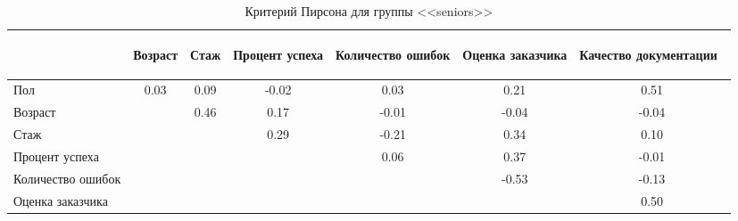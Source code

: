 \begin{table}[H]
	\centering
	\caption{Критерий Пирсона для группы <<seniors>>}
	\begin{tabular}{|l|c|c|c|c|c|c|}
		\hline
		& 
		\begin{sideways}
			Возраст
		\end{sideways}  & 
		\begin{sideways}
			Стаж
		\end{sideways} & 
		\begin{sideways}
			Процент успеха
		\end{sideways} & 
		\begin{sideways}
			Количество ошибок
		\end{sideways} &
		\begin{sideways}
			Оценка заказчика
		\end{sideways} & 
		\begin{sideways}
			Качество документации~
		\end{sideways} \\ \hline
		Пол                   & 0.03 & 0.09 & -0.02 & 0.03 & 0.21 & 0.51 \\ \hline
		Возраст               && 0.46 & 0.17 & -0.01 & -0.04 & -0.04  \\ \hline	
		Стаж                  &&& 0.29 & -0.21 & 0.34 & 0.10  \\ \hline
		Процент успеха        &&&& 0.06 & 0.37 & -0.01  \\ \hline
		Количество ошибок     &&&&& -0.53 & -0.13  \\ \hline	
		Оценка заказчика      &&&&&& 0.50  \\ \hline
	\end{tabular}
	\label{sen/p}
\end{table}

